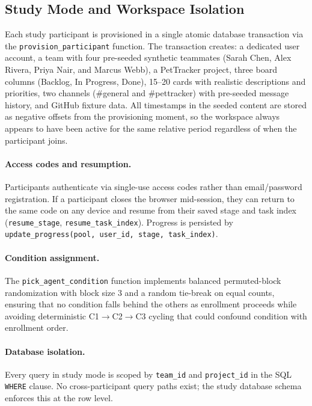 \subsection{Study Mode and Workspace Isolation}
\label{sec:system:study}

Each study participant is provisioned in a single atomic database transaction
via the \texttt{provision\_participant} function. The transaction creates:
a dedicated user account, a team with four pre-seeded synthetic teammates
(Sarah Chen, Alex Rivera, Priya Nair, and Marcus Webb), a PetTracker
project, three board columns (Backlog, In Progress, Done), 15--20 cards with
realistic descriptions and priorities, two channels (\#general and
\#pettracker) with pre-seeded message history, and GitHub fixture data.
All timestamps in the seeded content are stored as negative offsets from the
provisioning moment, so the workspace always appears to have been active for
the same relative period regardless of when the participant joins.

\paragraph{Access codes and resumption.}
Participants authenticate via single-use access codes rather than email/password
registration. If a participant closes the browser mid-session, they can return
to the same code on any device and resume from their saved stage and task index
(\texttt{resume\_stage}, \texttt{resume\_task\_index}). Progress is persisted by
\texttt{update\_progress(pool, user\_id, stage, task\_index)}.

\paragraph{Condition assignment.}
The \texttt{pick\_agent\_condition} function implements balanced permuted-block
randomization with block size 3 and a random tie-break on equal counts, ensuring
that no condition falls behind the others as enrollment proceeds while avoiding
deterministic C1$\to$C2$\to$C3 cycling that could confound condition with
enrollment order.

\paragraph{Database isolation.}
Every query in study mode is scoped by \texttt{team\_id} and
\texttt{project\_id} in the SQL \texttt{WHERE} clause. No cross-participant
query paths exist; the study database schema enforces this at the row level.

